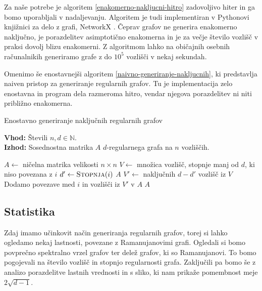 Za naše potrebe je algoritem \ref{enakomerno-nakljucni-hitro} zadovoljivo hiter in ga bomo uporabljali v nadaljevanju. Algoritem je tudi implementiran v Pythonovi knjižnici za delo z grafi, NetworkX \cite{networkx}. Čeprav grafov ne generira enakomerno naključno, je porazdelitev asimptotično enakomerna in je za večje število vozlišč v praksi dovolj blizu enakomerni. Z algoritmom lahko na običajnih osebnih računalnikih generiramo grafe z do \(10^5\) vozlišči v nekaj sekundah.

Omenimo še enostavnejši algoritem \ref{naivno-generiranje-nakljucnih}, ki predstavlja naiven pristop za generiranje regularnih grafov. Tu je implementacija zelo enostavna in program dela razmeroma hitro, vendar njegova porazdelitev ni niti približno enakomerna.

\begin{algorithm}[H]
    \caption{Enostavno generiranje naključnih regularnih grafov}
    \label{naivno-generiranje-nakljucnih}
    \raggedright
    \textbf{Vhod:} Števili \(n, d \in \mathbb N\). \\
    \textbf{Izhod:} Sosednostna matrika \(A\) \(d\)-regularnega grafa na \(n\) vozliščih.
    \begin{algorithmic}[1]
        \State \(A \gets\) ničelna matrika velikosti \(n \times n\)
        \State \(V \gets \) množica vozlišč, stopnje manj od \(d\), ki niso povezana z \(i\)
        \State \(d' \gets \Call{Stopnja}i\)
        \State \Return \(A\)
        \EndIf
        \State \(V' \gets \) naključnih \(d-d'\) vozlišč iz \(V\)
        \State Dodamo povezave med \(i\) in vozlišči iz \(V'\) v \(A\)
        \EndFor
        \State \Return $A$
        \EndFunction
    \end{algorithmic}
\end{algorithm}

\subsection{Statistika}
Zdaj imamo učinkovit način generiranja regularnih grafov, torej si lahko ogledamo nekaj lastnosti, povezane z Ramanujanovimi grafi. Ogledali si bomo povprečno spektralno vrzel grafov ter delež grafov, ki so Ramanujanovi. To bomo pogojevali na število vozlišč in stopnjo regularnosti grafa. Zaključili pa bomo še z analizo porazdelitve lastnih vrednosti in s sliko, ki nam prikaže pomembnost meje \(2\sqrt{d-1}\).

